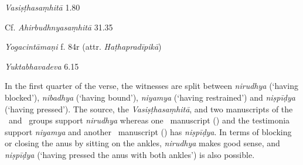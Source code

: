 \begin{ekdosis}
\begin{sources}[hp01_022]
\emph{Vasiṣṭhasaṃhitā} 1.80

\begin{versinnote}
\end{versinnote}

Cf. \emph{Ahirbudhnyasaṃhitā} 31.35

\begin{versinnote}
\end{versinnote}

\end{sources}

\begin{testimonia}[hp01_022]
\emph{Yogacintāmaṇi} f. 84r (attr. \emph{Haṭhapradīpikā})

\begin{versinnote}
\end{versinnote}

\emph{Yuktabhavadeva} 6.15

\begin{versinnote}
\end{versinnote}

\end{testimonia}

\begin{philcomm}[hp01_022]   
In the first quarter of the verse, the witnesses are split between \emph{nirudhya} (‘having blocked’), \emph{nibadhya} (‘having bound’), \emph{niyamya} (‘having restrained’) and \emph{niṣpīḍya} (‘having pressed’). The source, the \emph{Vasiṣṭhasaṃhitā}, and two manuscripts of the \textbeta\ and \textgamma\ groups support \emph{nirudhya} whereas one \textalpha\ manuscript () and the testimonia support \emph{niyamya} and another \textalpha\ manuscript () has \emph{niṣpīḍya}. In terms of blocking or closing the anus by sitting on the ankles, \emph{nirudhya} makes good sense, and \emph{niṣpīḍya} (`having pressed the anus with both ankles') is also possible.  


\end{philcomm}
\end{ekdosis}
